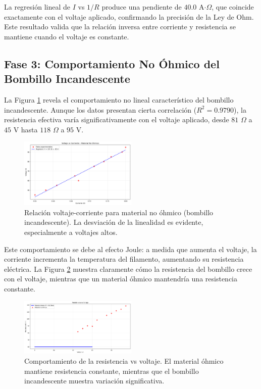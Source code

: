 \documentclass[11pt,twocolumn]{article}
\begin{document}
La regresión lineal de $I$ vs $1/R$ produce una pendiente de $40.0$ A$\cdot\Omega$, que coincide exactamente con el voltaje aplicado, confirmando la precisión de la Ley de Ohm. Este resultado valida que la relación inversa entre corriente y resistencia se mantiene cuando el voltaje es constante.

\subsection*{Fase 3: Comportamiento No Óhmico del Bombillo Incandescente}

La Figura \ref{fig:no_ohmico} revela el comportamiento no lineal característico del bombillo incandescente. Aunque los datos presentan cierta correlación ($R^2 = 0.9790$), la resistencia efectiva varía significativamente con el voltaje aplicado, desde $81$ $\Omega$ a $45$ V hasta $118$ $\Omega$ a $95$ V.

\begin{figure}[H]
\centering
\includegraphics[width=0.5\textwidth]{graficas/voltaje_vs_corriente_no_ohmico.png}
\caption{Relación voltaje-corriente para material no óhmico (bombillo incandescente). La desviación de la linealidad es evidente, especialmente a voltajes altos.}
\label{fig:no_ohmico}
\end{figure}

Este comportamiento se debe al efecto Joule: a medida que aumenta el voltaje, la corriente incrementa la temperatura del filamento, aumentando su resistencia eléctrica. La Figura \ref{fig:resistencia_voltaje} muestra claramente cómo la resistencia del bombillo crece con el voltaje, mientras que un material óhmico mantendría una resistencia constante.

\begin{figure}[H]
\centering
\includegraphics[width=0.5\textwidth]{graficas/resistencia_vs_voltaje.png}
\caption{Comportamiento de la resistencia vs voltaje. El material óhmico mantiene resistencia constante, mientras que el bombillo incandescente muestra variación significativa.}
\label{fig:resistencia_voltaje}
\end{figure}
\end{document}
